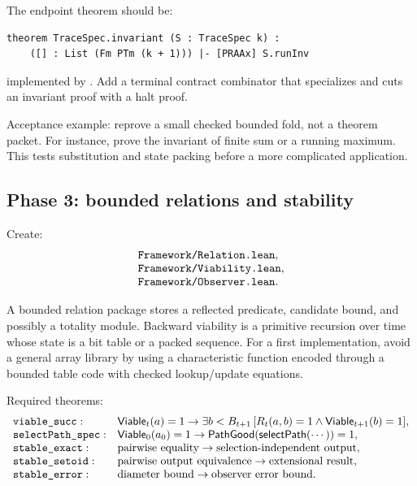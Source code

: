 The endpoint theorem should be:

\begin{lstlisting}[language={}]
theorem TraceSpec.invariant (S : TraceSpec k) :
    ([] : List (Fm PTm (k + 1))) |- [PRAAx] S.runInv
\end{lstlisting}

implemented by .  Add a terminal contract combinator that
specializes and cuts an invariant proof with a halt proof.

Acceptance example: reprove a small checked bounded fold, not a theorem packet.
For instance, prove the invariant of finite sum or a running maximum.  This
tests substitution and state packing before a more complicated application.

\subsection{Phase 3: bounded relations and stability}

Create:
\[
\begin{array}{l}
\code{Framework/Relation.lean},\\
\code{Framework/Viability.lean},\\
\code{Framework/Observer.lean}.
\end{array}
\]

A bounded relation package stores a reflected predicate, candidate bound, and
possibly a totality module.  Backward viability is a primitive recursion over
time whose state is a bit table or a packed sequence.  For a first
implementation, avoid a general array library by using a characteristic
function encoded through a bounded table code with checked lookup/update
equations.

Required theorems:
\[
\begin{array}{ll}
\code{viable_succ}:&
 \Viable_t(a)=1\to
 \exists b<B_{t+1}\,[R_t(a,b)=1\wedge\Viable_{t+1}(b)=1],\\
\code{selectPath_spec}:&
 \Viable_0(a_0)=1\to \mathsf{PathGood}(\mathsf{selectPath}(\cdots))=1,\\
\code{stable_exact}:&
 \text{pairwise equality}\to \text{selection-independent output},\\
\code{stable_setoid}:&
 \text{pairwise output equivalence}\to \text{extensional result},\\
\code{stable_error}:&
 \text{diameter bound}\to \text{observer error bound}.
\end{array}
\]

